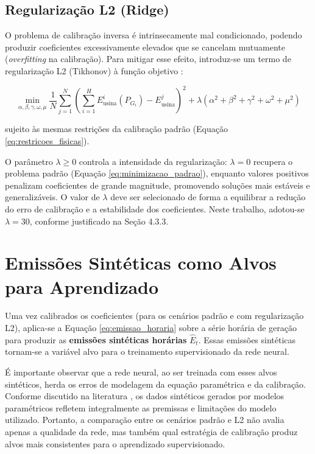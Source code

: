 \subsection{Regularização L2 (Ridge)}

O problema de calibração inversa é intrinsecamente mal condicionado, podendo produzir coeficientes excessivamente elevados que se cancelam mutuamente (\textit{overfitting} na calibração). Para mitigar esse efeito, introduz-se um termo de regularização L2 (Tikhonov) à função objetivo \cite{tikhonov1977solutions}:

\begin{equation}
\min_{\alpha,\beta,\gamma,\omega,\mu} \frac{1}{N} \sum_{j=1}^{N} \left( \sum_{i=1}^{H} E_{\text{usina}}^{i}(P_{G_i}) - E_{\text{usina}}^{j} \right)^2 + \lambda \left( \alpha^2 + \beta^2 + \gamma^2 + \omega^2 + \mu^2 \right)
\label{eq:regularizacao_l2}
\end{equation}

sujeito às mesmas restrições da calibração padrão (Equação \ref{eq:restricoes_fisicas}).

O parâmetro \(\lambda \geq 0\) controla a intensidade da regularização: \(\lambda = 0\) recupera o problema padrão (Equação \ref{eq:minimizacao_padrao}), enquanto valores positivos penalizam coeficientes de grande magnitude, promovendo soluções mais estáveis e generalizáveis. O valor de \(\lambda\) deve ser selecionado de forma a equilibrar a redução do erro de calibração e a estabilidade dos coeficientes. Neste trabalho, adotou-se \(\lambda = 30\), conforme justificado na Seção 4.3.3.

\section{Emissões Sintéticas como Alvos para Aprendizado}

Uma vez calibrados os coeficientes (para os cenários padrão e com regularização L2), aplica-se a Equação \ref{eq:emissao_horaria} sobre a série horária de geração para produzir as \textbf{emissões sintéticas horárias} \(\hat{E}_t\). Essas emissões sintéticas tornam-se a variável alvo para o treinamento supervisionado da rede neural.

É importante observar que a rede neural, ao ser treinada com esses alvos sintéticos, herda os erros de modelagem da equação paramétrica e da calibração. Conforme discutido na literatura \cite{nowok2016synthpop, stenger2024synthetic}, os dados sintéticos gerados por modelos paramétricos refletem integralmente as premissas e limitações do modelo utilizado. Portanto, a comparação entre os cenários padrão e L2 não avalia apenas a qualidade da rede, mas também qual estratégia de calibração produz alvos mais consistentes para o aprendizado supervisionado.

